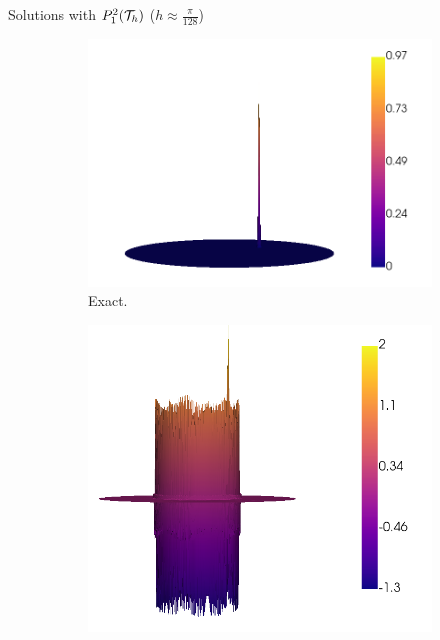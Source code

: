 			\begin{frame}{Solutions with $\relax{P}_1^2(\mathcal{T}_h)$ ($h\approx\frac{\pi}{128}$)}
				\vspace*{-0.5cm}
				\begin{figure}[h!]
					\begin{subfigure}[b]{0.49\textwidth}
						\centering
						\includegraphics[scale=0.16]{img/Conveccion_Reaccion/strong/conv_react_u_ex_nx-256.png}
						\caption{Exact.}
					\end{subfigure}
					\begin{subfigure}[b]{0.49\textwidth}
						\centering
						\includegraphics[scale=0.16]{img/Conveccion_Reaccion/strong/conv_react_u_FE_nx-256.png}

\end{subfigure}
\end{figure}
\end{frame}

